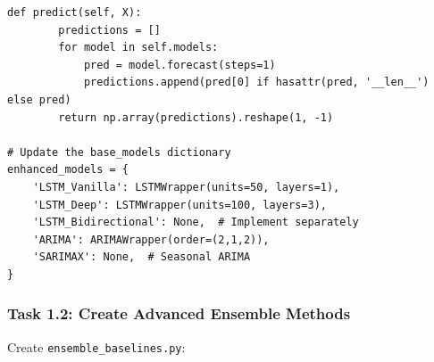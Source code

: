 \documentclass[11pt]{article}
\begin{document}
\begin{lstlisting}[style=pythonstyle, caption=Enhanced Baseline Models]
    def predict(self, X):
        predictions = []
        for model in self.models:
            pred = model.forecast(steps=1)
            predictions.append(pred[0] if hasattr(pred, '__len__') else pred)
        return np.array(predictions).reshape(1, -1)

# Update the base_models dictionary
enhanced_models = {
    'LSTM_Vanilla': LSTMWrapper(units=50, layers=1),
    'LSTM_Deep': LSTMWrapper(units=100, layers=3),
    'LSTM_Bidirectional': None,  # Implement separately
    'ARIMA': ARIMAWrapper(order=(2,1,2)),
    'SARIMAX': None,  # Seasonal ARIMA
}
\end{lstlisting}

\subsubsection{Task 1.2: Create Advanced Ensemble Methods}

Create \texttt{ensemble\_baselines.py}:
\end{document}
